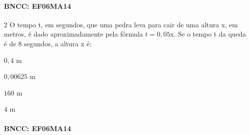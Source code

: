 \paragraph{BNCC: EF06MA14 }


\num{2}  O tempo t, em segundos, que uma pedra leva para cair de uma altura x,
em metros, é dado aproximadamente pela fórmula $t = 0,05$x. Se o tempo t
da queda é de $8$ segundos, a altura x é:

\begin{escolha}
\item $0,4$ m
\item $0,00625$ m
\item $160$ m
\item $4$ m
\end{escolha}

\paragraph{BNCC: EF06MA14 }


